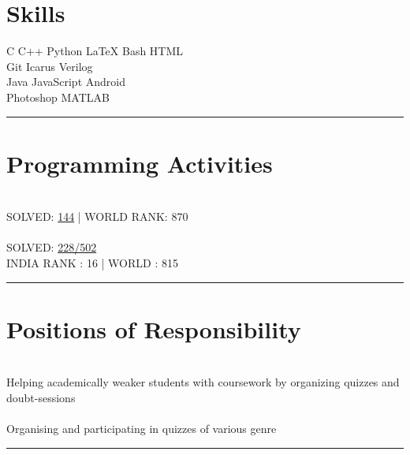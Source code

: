 \documentclass[letterpaper]{Formatting}
\begin{document}
\begin{minipage}[t]{0.3\textwidth}
\section{Skills}


C \textbullet{} C++ \textbullet{} Python \textbullet{} \LaTeX \textbullet{} Bash \textbullet{} HTML\\
Git \textbullet{} Icarus Verilog \\
Java \textbullet{} JavaScript \textbullet{} Android\\
Photoshop \textbullet{} MATLAB
\sectionspace %
\vspace{-1.5ex}
\rule{5cm}{0.5pt}
\vspace{2ex}


\section{Programming Activities}
\\\vspace{0.5ex}
\small\uppercase {Solved: }\href{http://www.spoj.com/users/rbavishi/}{144} | \uppercase{World Rank: 870}\\
\vspace{2ex}
\\\vspace{0.5ex}
\small \uppercase{Solved: }\href{https://projecteuler.net/profile/RJBavishi.png}{228/502} \\
\small \uppercase{India Rank : 16 | World : 815}
\vspace{1ex}
\rule{5cm}{0.5pt}
\vspace{2ex}


\section{Positions of Responsibility}
\\
\vspace{1ex}
\footnotesize \textbullet{} Helping academically weaker students with coursework by organizing quizzes and doubt-sessions\\
\vspace{3ex}
\\
\vspace{1ex}
\footnotesize \textbullet{} Organising and participating in quizzes of various genre\\
\vspace{1ex}
\rule{5cm}{0.5pt}
\end{minipage} %
\end{document}
